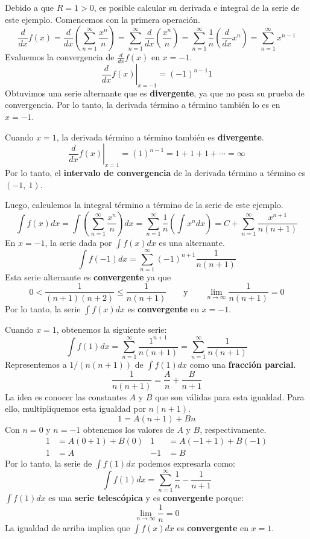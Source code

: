\documentclass[12pt]{article}
\begin{document}
Debido a que $R = 1 > 0$, es posible calcular su derivada e integral de la serie de este ejemplo. Comencemos con la primera operación.
\[
  \frac{d}{dx} f(x) = \frac{d}{dx} \left(\sum_{n = 1}^{\infty} \frac{x^{n}}{n}\right)
                    = \sum_{n = 1}^{\infty} \frac{d}{dx} \left(\frac{x^{n}}{n}\right)
                    = \sum_{n = 1}^{\infty} \frac{1}{n} \left(\frac{d}{dx} x^{n}\right)
                    = \sum_{n = 1}^{\infty} x^{n - 1}
\]
Evaluemos la convergencia de $\frac{d}{dx} f(x)$ en $x = -1$.
\[
  \left. \frac{d}{dx} f(x) \right|_{x = -1} = (-1)^{n - 1} 1
\]
Obtuvimos una serie alternante que es \textbf{divergente}, ya que no pasa su prueba de convergencia. Por lo tanto, la derivada término a término también lo es en $x = -1$.

Cuando $x = 1$, la derivada término a término también es \textbf{divergente}.
\[
  \left. \frac{d}{dx} f(x) \right|_{x = 1} = (1)^{n - 1} = 1 + 1 + 1 + \cdots = \infty
\]
Por lo tanto, el \textbf{intervalo de convergencia} de la derivada término a término es $(-1, \ 1)$.

Luego, calculemos la integral término a término de la serie de este ejemplo.
\[
  \int f(x)dx = \int \left(\sum_{n = 1}^{\infty} \frac{x^{n}}{n}\right) dx
              = \sum_{n = 1}^{\infty} \frac{1}{n} \left(\int x^{n} dx\right)
              = C + \sum_{n = 1}^{\infty} \frac{x^{n + 1}}{n(n + 1)}
\]
En $x = -1$, la serie dada por $\int f(x)dx$ es una alternante.
\[
  \int f(-1)dx = \sum_{n = 1}^{\infty} (-1)^{n + 1} \frac{1}{n(n + 1)}
\]
Esta serie alternante es \textbf{convergente} ya que
\[
  0 < \frac{1}{(n + 1)(n + 2)} \leq \frac{1}{n(n + 1)}
  \qquad \text{y} \qquad
  \lim_{n \to \infty} \frac{1}{n(n + 1)} = 0
\]
Por lo tanto, la serie $\int f(x)dx$ es \textbf{convergente} en $x = -1$.

Cuando $x = 1$, obtenemos la siguiente serie:
\[
  \int f(1)dx = \sum_{n = 1}^{\infty} \frac{1^{n + 1}}{n(n + 1)} = \sum_{n = 1}^{\infty} \frac{1}{n(n + 1)}
\]
Representemos a $1/(n(n + 1))$ de $\int f(1)dx$ como una \textbf{fracción parcial}.
\[
  \frac{1}{n(n + 1)} = \frac{A}{n} + \frac{B}{n + 1}
\]
La idea es conocer las constantes $A$ y $B$ que son válidas para esta igualdad. Para ello, multipliquemos esta igualdad por $n(n + 1)$.
\[
  1 = A(n + 1) + Bn
\]
Con $n = 0$ y $n = -1$ obtenemos los valores de $A$ y $B$, respectivamente.
\begin{align*}
  1 &= A(0 + 1) + B(0) & 1 &= A(-1 + 1) + B(-1) \\
  1 &= A               & -1 &= B
\end{align*}
Por lo tanto, la serie de $\int f(1)dx$ podemos expresarla como:
\[
  \int f(1)dx = \sum_{n = 1}^{\infty} \frac{1}{n} - \frac{1}{n + 1}
\]
$\int f(1)dx$ es una \textbf{serie telescópica} y es \textbf{convergente} porque:
\[
  \lim_{n \to \infty} \frac{1}{n} = 0
\]
La igualdad de arriba implica que $\int f(x)dx$ es \textbf{convergente} en $x = 1$.
\end{document}

